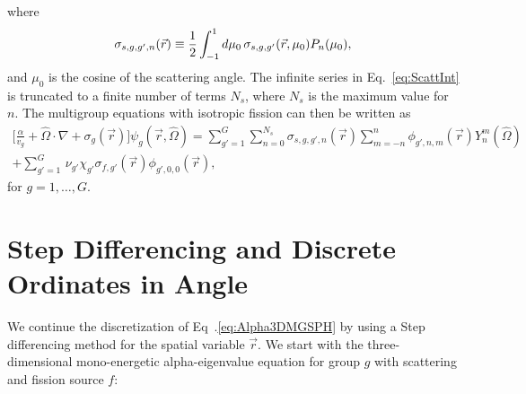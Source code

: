 where
\begin{equation}
	\sigma_{s,g,g',n}(\vec{r}) \equiv \frac{1}{2} \int_{-1}^{1} \mathop{}\!d \mu_{0} \, \sigma_{s,g,g'}(\vec{r},\mu_{0}) P_{n}(\mu_{0}),
\end{equation}
and $\mu_{0}$ is the cosine of the scattering angle. The infinite series in Eq.~\ref{eq:ScattInt} is truncated to a finite number of terms $N_{s}$, where $N_{s}$ is the maximum value for $n$. The multigroup equations with isotropic fission can then be written as
\begin{multline}
	\bigg [ \frac{\alpha}{v_{g}} + \hat{\Omega} \cdot \nabla + \sigma_{g}(\vec{r}) \bigg ] \psi_{g}(\vec{r},\hat{\Omega}) = \sum_{g'=1}^{G} \sum_{n=0}^{N_{s}} \sigma_{s,g,g',n}(\vec{r}) \sum_{m=-n}^{n} \phi_{g',n,m}(\vec{r}) Y_{n}^{m}(\hat{\Omega}) \\ + \sum_{g'=1}^{G} \, \nu_{g'} \chi_{g'} \sigma_{f,g'}(\vec{r}) \phi_{g',0,0}(\vec{r}), 
	\label{eq:Alpha3DMGSPH}
\end{multline}
for $g = 1, \dots, G$.

\section{Step Differencing and Discrete Ordinates in Angle}

We continue the discretization of Eq~.\ref{eq:Alpha3DMGSPH} by using a Step differencing method for the spatial variable $\vec{r}$. We start with the three-dimensional mono-energetic alpha-eigenvalue equation for group $g$ with scattering and fission source $f$:


